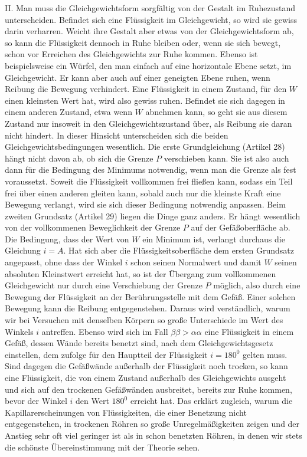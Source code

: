 II. Man muss die Gleichgewichtsform sorgfältig von der Gestalt im Ruhezustand unterscheiden. Befindet sich eine Flüssigkeit im Gleichgewicht, so wird sie gewiss darin verharren. Weicht ihre Gestalt aber etwas von der Gleichgewichtsform ab, so kann die Flüssigkeit dennoch in Ruhe bleiben oder, wenn sie sich bewegt, schon vor Erreichen des Gleichgewichts zur Ruhe kommen. Ebenso ist beispielsweise ein Würfel, den man einfach auf eine horizontale Ebene setzt, im Gleichgewicht. Er kann aber auch auf einer geneigten Ebene ruhen, wenn Reibung die Bewegung verhindert. Eine Flüssigkeit in einem Zustand, für den $W$ einen kleinsten Wert hat, wird also gewiss ruhen. Befindet sie sich dagegen in einem anderen Zustand, etwa wenn $W$ abnehmen kann, so geht sie aus diesem Zustand nur insoweit in den Gleichgewichtszustand über, als Reibung sie daran nicht hindert. In dieser Hinsicht unterscheiden sich die beiden Gleichgewichtsbedingungen wesentlich. Die erste Grundgleichung (Artikel 28) hängt nicht davon ab, ob sich die Grenze $P$ verschieben kann. Sie ist also auch dann für die Bedingung des Minimums notwendig, wenn man die Grenze als fest voraussetzt. Soweit die Flüssigkeit vollkommen frei fließen kann, sodass ein Teil frei über einen anderen gleiten kann, sobald auch nur die kleinste Kraft eine Bewegung verlangt, wird sie sich dieser Bedingung notwendig anpassen. Beim zweiten Grundsatz (Artikel 29) liegen die Dinge ganz anders. Er hängt wesentlich von der vollkommenen Beweglichkeit der Grenze $P$ auf der Gefäßoberfläche ab. Die Bedingung, dass der Wert von $W$ ein Minimum ist, verlangt durchaus die Gleichung $i=A$. Hat sich aber die Flüssigkeitsoberfläche dem ersten Grundsatz angepasst, ohne dass der Winkel $i$ schon seinen Normalwert und damit $W$ seinen absoluten Kleinstwert erreicht hat, so ist der Übergang zum vollkommenen Gleichgewicht nur durch eine Verschiebung der Grenze $P$ möglich, also durch eine Bewegung der Flüssigkeit an der Berührungsstelle mit dem Gefäß. Einer solchen Bewegung kann die Reibung entgegenstehen. Daraus wird verständlich, warum wir bei Versuchen mit denselben Körpern so große Unterschiede im Wert des Winkels $i$ antreffen. Ebenso wird sich im Fall $\beta\beta>\alpha\alpha$ eine Flüssigkeit in einem Gefäß, dessen Wände bereits benetzt sind, nach dem Gleichgewichtsgesetz einstellen, dem zufolge für den Hauptteil der Flüssigkeit $i=180^0$ gelten muss. Sind dagegen die Gefäßwände außerhalb der Flüssigkeit noch trocken, so kann eine Flüssigkeit, die von einem Zustand außerhalb des Gleichgewichts ausgeht und sich auf den trockenen Gefäßwänden ausbreitet, bereits zur Ruhe kommen, bevor der Winkel $i$ den Wert $180^0$ erreicht hat. Das erklärt zugleich, warum die Kapillarerscheinungen von Flüssigkeiten, die einer Benetzung nicht entgegenstehen, in trockenen Röhren so große Unregelmäßigkeiten zeigen und der Anstieg sehr oft viel geringer ist als in schon benetzten Röhren, in denen wir stets die schönste Übereinstimmung mit der Theorie sehen.

